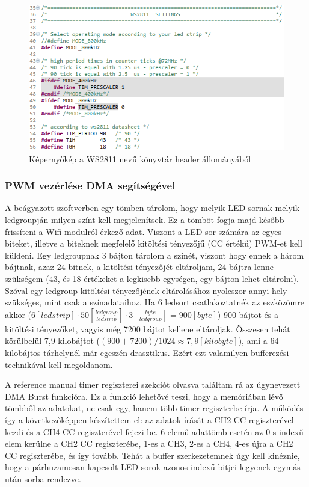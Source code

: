 \documentclass[../main.tex]{subfiles}
\begin{document}
            \begin{figure}[h!]
                \centering
                    \includegraphics[width=12cm]{mbed_res/ws2811_timing_values}
                \caption{Képernyőkép a WS2811 nevű könyvtár header állományából}
                \label{fig:ws2811_timing_values}
            \end{figure}
         
        \subsubsection{PWM vezérlése DMA segítségével}  
             A beágyazott szoftverben egy tömben tárolom, hogy melyik LED sornak melyik ledgroupján milyen színt kell megjelenítsek. Ez a tömböt fogja majd később frissíteni a Wifi modulról érkező adat. Viszont a LED sor számára az egyes biteket, illetve a biteknek megfelelő kitöltési tényezőjű (CC értékű) PWM-et kell küldeni. Egy ledgroupnak 3 bájton tárolom a színét, viszont hogy ennek a három bájtnak, azaz 24 bitnek, a kitöltési tényezőjét eltároljam, 24 bájtra lenne szükségem (43, és 18 értékeket a legkisebb egységen, egy bájton lehet eltárolni). Szóval egy ledgroup kitöltési tényezőjének eltárolásához nyolcszor annyi hely szükséges, mint csak a színadataihoz. Ha 6 ledsort csatlakoztatnék az eszközömre akkor ($ 6[ledstrip]\cdot 50 [\frac{ledgroup}{ledstrip}] \cdot 3 [\frac{byte}{ledgroup}] = 900 [byte]$) 900 bájtot és a kitöltési tényezőket, vagyis még 7200 bájtot kellene eltároljak. Összesen tehát körülbelül 7,9 kilobájtot ($ (900+7200)/1024 \approx 7,9[kilobyte]$), ami a 64 kilobájtos tárhelynél már egeszén drasztikus. Ezért ezt valamilyen bufferezési technikával kell megoldanom.
             
             A reference manual \cite{rm0008} timer regiszterei szekciót olvasva találtam rá az úgynevezett DMA Burst funkcióra. Ez a funkció lehetővé teszi, hogy a memóriában lévő tömbből az adatokat, ne csak egy, hanem több timer regiszterbe írja. A működés így a következőképpen készítettem el: az adatok írását a CH2 CC regiszterével kezdi és a CH4 CC regiszterével fejezi be. 6 elemű adattömb esetén az 0-s indexű elem kerülne a CH2 CC regiszterébe, 1-es a CH3, 2-es a CH4, 4-es újra a CH2 CC regiszterébe, és így tovább. Tehát a buffer szerkezetemnek úgy kell kinéznie, hogy a párhuzamosan kapcsolt LED sorok azonos indexű bitjei legyenek egymás után sorba rendezve.
             
\end{document}
